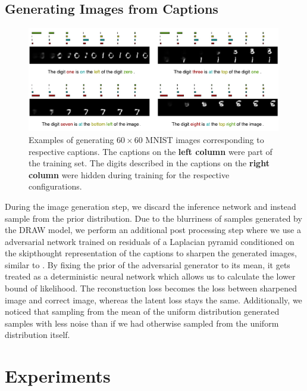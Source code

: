 \documentclass{article} %
\begin{document}
\subsection{Generating Images from Captions}

\begin{figure}[!t]
\captionsetup[subfigure]{labelformat=empty}
\begin{center}
\includegraphics[width=0.99\textwidth]{figures/new/mnist/test3.pdf}\quad
%
\end{center}
\caption{Examples of generating $60 \times 60$ MNIST images corresponding to respective captions. The captions on the \textbf{left column} were part of the training set. The digits described in the captions on the \textbf{right column} were hidden during training for the respective configurations.}
\label{fig:figmnist}
\vspace{-0.3cm}
\end{figure}

During the image generation step, we discard the inference network and instead sample from the prior distribution. 
Due to the blurriness of samples generated by the DRAW model, we perform an additional post processing step where we use a 
adversarial network trained on residuals of a Laplacian pyramid conditioned on the skipthought representation \citep{kiros_skipthought} of the captions 
to sharpen the generated images, similar to \citep{denton_lapgan}. By fixing the prior of the adversarial generator to its mean, it gets treated as a deterministic neural network which allows us to calculate the lower bound of likelihood. The reconstuction loss becomes the loss between sharpened image and correct image, whereas the latent loss stays the same. Additionally, we noticed that sampling from the mean of the uniform distribution generated samples with less noise than if we had otherwise sampled from the uniform distribution itself.  

\newpage
\section{Experiments}
\end{document}
